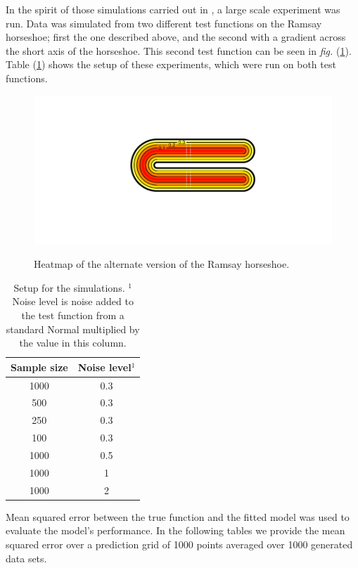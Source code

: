 \documentclass[a4paper,10pt]{amsart}
\newcommand{\fig}[1]{\emph{fig.} (\ref{#1})}
\begin{document}
In the spirit of those simulations carried out in \cite{soap}, a large scale experiment was run. Data was simulated from two different test functions on the Ramsay horseshoe; first the one described above, and the second with a gradient across the short axis of the horseshoe. This second test function can be seen in \fig{altramsayhorseshoe}. Table (\ref{simtable}) shows the setup of these experiments, which were run on both test functions.

\begin{figure}
\centering
\includegraphics[trim=0.5in 1in 0in 0.5in]{figs/altramsayhorseshoe.pdf} \\
\caption{Heatmap of the alternate version of the Ramsay horseshoe.}
\label{altramsayhorseshoe}
\end{figure}

\begin{table}[ht]
\begin{tabular}{c c}\\
Sample size & Noise level$^{1}$ \\
\hline
\hline
1000 & 0.3 \\
500 & 0.3 \\
250 & 0.3 \\
100 & 0.3 \\
1000 & 0.5 \\
1000 & 1 \\
1000 & 2 \\
\end{tabular}
\caption{Setup for the simulations. $^{1}$Noise level is noise added to the test function from a standard Normal multiplied by the value in this column.}
\label{simtable}
\end{table}

Mean squared error between the true function and the fitted model was used to evaluate the model's performance. In the following tables we provide the mean squared error over a prediction grid of 1000 points averaged over 1000 generated data sets.
\end{document}
